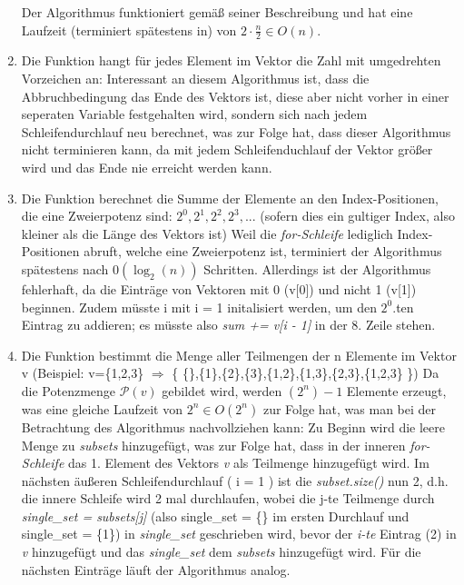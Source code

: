 \documentclass{article}
\begin{document}
\begin{enumerate}[label=(\alph*)]
		Der Algorithmus funktioniert gemäß seiner Beschreibung und hat eine Laufzeit (terminiert spätestens in) von $2 \cdot \frac{n}{2} \in O(n)$.

		\item Die Funktion hangt für jedes Element im Vektor die Zahl mit umgedrehten Vorzeichen an:
		\newline\newline
		Interessant an diesem Algorithmus ist, dass die Abbruchbedingung das Ende des Vektors ist, diese aber nicht vorher in einer seperaten Variable festgehalten wird, sondern sich
		nach jedem Schleifendurchlauf neu berechnet, was zur Folge hat, dass dieser Algorithmus nicht terminieren kann, da mit jedem Schleifenduchlauf der Vektor größer wird und das Ende
		nie erreicht werden kann.

		\item Die Funktion berechnet die Summe der Elemente an den Index-Positionen, die eine Zweierpotenz
		sind: $2^0, 2^1, 2^2, 2^3, ...$ (sofern dies ein gultiger Index, also kleiner als die Länge des Vektors ist)
		\newline\newline
		Weil die \textit{for-Schleife} lediglich Index-Positionen abruft, welche eine Zweierpotenz ist, terminiert der Algorithmus spätestens nach $0(\log_2(n))$ Schritten.
		Allerdings ist der Algorithmus fehlerhaft, da die Einträge von Vektoren mit 0 (v[0]) und nicht 1 (v[1]) beginnen. Zudem müsste i mit i = 1 initalisiert werden, um den $2^0$.ten Eintrag
		zu addieren; es müsste also \textit{sum += v[i - 1]} in der 8. Zeile stehen.

		\item  Die Funktion bestimmt die Menge aller Teilmengen der n Elemente im Vektor v (Beispiel: v=\{1,2,3\} $\Rightarrow$  \{ \{\},\{1\},\{2\},\{3\},\{1,2\},\{1,3\},\{2,3\},\{1,2,3\} \})
		\newline\newline
		Da die Potenzmenge $\mathcal{P}(v)$ gebildet wird, werden $(2^n) - 1$ Elemente erzeugt, was eine gleiche Laufzeit von $2^n \in O(2^n)$ zur Folge hat, was man bei der Betrachtung des Algorithmus
		nachvollziehen kann:\newline
		Zu Beginn wird die leere Menge zu \textit{subsets} hinzugefügt, was zur Folge hat, dass in der inneren \textit{for-Schleife} das 1. Element des Vektors \emph{v} als Teilmenge hinzugefügt wird.
		Im nächsten äußeren Schleifendurchlauf \newline( i = 1 ) ist die \emph{subset.size()} nun 2, d.h. die innere Schleife wird 2 mal durchlaufen, wobei die j-te Teilmenge durch 
		\emph{single\_set = subsets[j]} (also single\_set = \{\} im ersten Durchlauf und single\_set = \{1\}) in \emph{single\_set} geschrieben wird, bevor der \emph{i-te} Eintrag (2) in \emph{v}
		hinzugefügt und das \emph{single\_set} dem \emph{subsets} hinzugefügt wird.
		Für die nächsten Einträge läuft der Algorithmus analog.   

    \end{enumerate}
\end{document}
